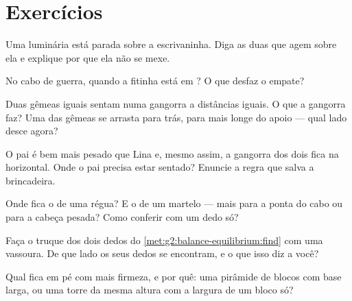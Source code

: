 \section{Exercícios}

\begin{exercise}[$\star$]\label{exo:g2:balance-equilibrium:1}
Uma luminária está parada sobre a escrivaninha. Diga as duas 
que agem sobre ela e explique por que ela não se mexe.
\end{exercise}

\begin{exercise}[$\star$]\label{exo:g2:balance-equilibrium:2}
No cabo de guerra, quando a fitinha está em ? O que desfaz
o empate?
\end{exercise}

\begin{exercise}[$\star$]\label{exo:g2:balance-equilibrium:3}
Duas gêmeas iguais sentam numa gangorra a distâncias iguais. O que a
gangorra faz? Uma das gêmeas se arrasta para trás, para mais longe do
apoio --- qual lado desce agora?
\end{exercise}

\begin{exercise}[$\star$]\label{exo:g2:balance-equilibrium:4}
O pai é bem mais pesado que Lina e, mesmo assim, a gangorra dos dois
fica na horizontal. Onde o pai precisa estar sentado? Enuncie a regra
que salva a brincadeira.
\end{exercise}

\begin{exercise}[$\star$]\label{exo:g2:balance-equilibrium:5}
Onde fica o  de uma régua? E o de um martelo ---
mais para a ponta do cabo ou para a cabeça pesada? Como conferir com
um dedo só?
\end{exercise}

\begin{exercise}[$\star$]\label{exo:g2:balance-equilibrium:6}
Faça o truque dos dois dedos do
\cref{met:g2:balance-equilibrium:find} com uma vassoura. De que lado
os seus dedos se encontram, e o que isso diz a você?
\end{exercise}

\begin{exercise}[$\star$]\label{exo:g2:balance-equilibrium:7}
Qual fica em pé com mais firmeza, e por quê: uma pirâmide de blocos
com base larga, ou uma torre da mesma altura com a largura de um
bloco só?
\end{exercise}

